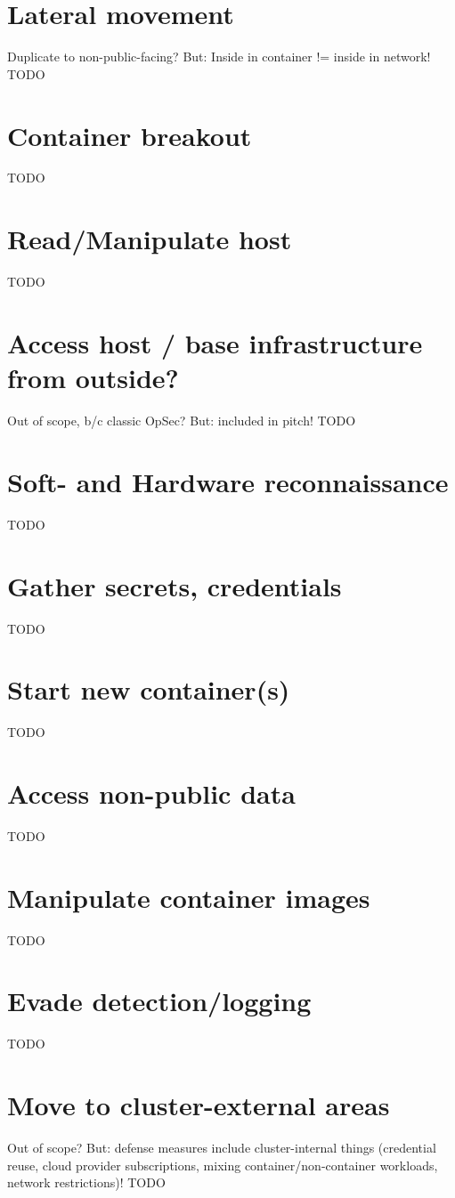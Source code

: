 \section{Lateral movement}
Duplicate to non-public-facing? But: Inside in container != inside in network!
TODO

\section{Container breakout}
TODO

\section{Read/Manipulate host}
TODO

\section{Access host / base infrastructure from outside?}
Out of scope, b/c classic OpSec? But: included in pitch!
TODO

\section{Soft- and Hardware reconnaissance}
TODO

\section{Gather secrets, credentials}
TODO

\section{Start new container(s)}
TODO

\section{Access non-public data}
TODO

\section{Manipulate container images}
TODO

\section{Evade detection/logging}
TODO

\section{Move to cluster-external areas}
Out of scope? But: defense measures include cluster-internal things (credential reuse, cloud provider subscriptions, mixing container/non-container workloads, network restrictions)!
TODO

